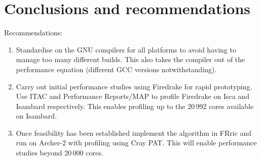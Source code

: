 \documentclass[a4paper,titlepage]{article}
\begin{document}

\section{Conclusions and recommendations}

Recommendations:
\begin{enumerate}
\item Standardise on the GNU compilers for all platforms to avoid having to manage too many different builds. This also takes the compiler out of the performance equation (different GCC versions notwithstanding).
\item Carry out initial performance studies using Firedrake for rapid prototyping. Use ITAC and Performance Reports/MAP to profile Firedrake on Isca and Isambard respectively. This enables profiling up to the 20\,992 cores available on Isambard.
\item Once feasibility has been established implement the algorithm in FRric and run on Archer-2 with profiling using Cray PAT. This will enable performance studies beyond 20\,000 cores.
\end{enumerate}

\end{document}
